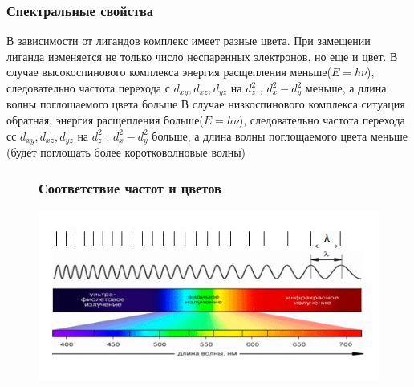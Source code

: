 \subsubsection{Спектральные свойства}
 В зависимости от лигандов комплекс имеет разные цвета. При замещении лиганда изменяется не только число неспаренных электронов, но еще и цвет. В случае высокоспинового комплекса энергия расщепления меньше($E=h\nu$), следовательно частота перехода с $d_{xy},d_{xz},d_{yz}$ на $d_z^2$ , $d_x^2-d_y^2$ меньше, а длина волны поглощаемого цвета больше В случае низкоспинового комплекса ситуация обратная, энергия расщепления больше($E=h\nu$), следовательно частота перехода сс $d_{xy},d_{xz},d_{yz}$ на $d_z^2$ , $d_x^2-d_y^2$ больше, а длина волны поглощаемого цвета меньше (будет поглощать более коротковолновые волны) \begin{figure}[htp]
 
\subsubsection{Соответствие частот и цветов}
\centering
\includegraphics[scale=.750]{images/spectre.jpg}
\end{figure}
 
 